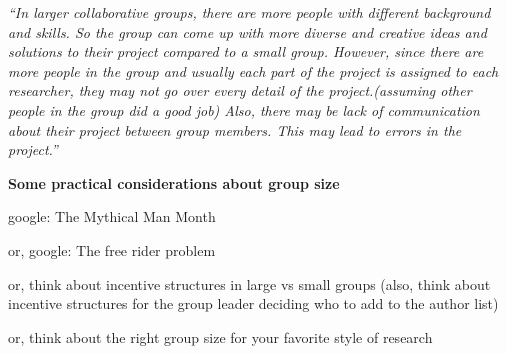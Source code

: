 \documentclass[portrait,11pt]{seminar}
\begin{document}

\es \bs 
{\it ``In larger collaborative groups, there are more people with different background and skills. So the group can come up with more diverse and creative ideas and solutions to their project compared to a small group. However, since there are more people in the group and usually each part of the project is assigned to each researcher, they may not go over every detail of the project.(assuming other people in the group did a good job) Also, there may be lack of communication about their project between group members. This may lead to errors in the project.''}









\es

\bs
{\bf Some practical considerations about group size}

\vspace{1cm}

{
google: The Mythical Man Month

\medskip

or, google: The free rider problem

\medskip

or, think about incentive structures in large vs small groups (also, think about incentive structures for the group leader deciding who to add to the author list)

\medskip

or, think about the right group size for your favorite style of research
}
\end{document}
